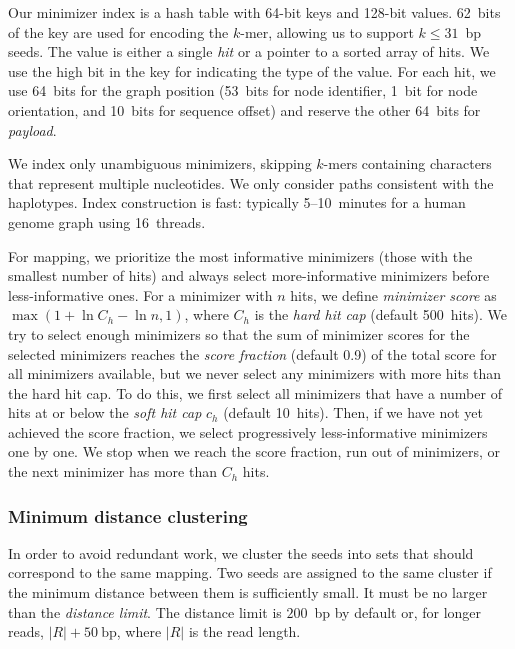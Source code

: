 \documentclass[11pt]{ucscthesis}
\newcommand{\param}[1]{\emph{#1}}
\newcommand{\vocab}[1]{\emph{#1}}
\begin{document}
Our minimizer index is a hash table with 64-bit keys and 128-bit values.
62~bits of the key are used for encoding the $k$-mer, allowing us to support $k \le 31$~bp seeds.
The value is either a single \vocab{hit} or a pointer to a sorted array of hits.
We use the high bit in the key for indicating the type of the value.
For each hit, we use 64~bits for the graph position (53~bits for node identifier, 1~bit for node orientation, and 10~bits for sequence offset) and reserve the other 64~bits for \vocab{payload}.

We index only unambiguous minimizers, skipping $k$-mers containing characters that represent multiple nucleotides.
We only consider paths consistent with the haplotypes.
Index construction is fast: typically 5--10~minutes for a human genome graph using 16~threads.

For mapping, we prioritize the most informative minimizers (those with the smallest number of hits) and always select more-informative minimizers before less-informative ones.
For a minimizer with $n$ hits, we define \vocab{minimizer score} as $\max\left(1 + \ln C_h - \ln n, 1\right)$, where $C_h$ is the \param{hard hit cap} (default 500~hits).
We try to select enough minimizers so that the sum of minimizer scores for the selected minimizers reaches the \param{score fraction} (default 0.9) of the total score for all minimizers available, but we never select any minimizers with more hits than the hard hit cap.
To do this, we first select all minimizers that have a number of hits at or below the \param{soft hit cap} $c_h$ (default 10~hits).
Then, if we have not yet achieved the score fraction, we select progressively less-informative minimizers one by one. We stop when we reach the score fraction, run out of minimizers, or the next minimizer has more than $C_h$ hits.

\subsubsection{Minimum distance clustering}
\label{subsec:aim2:clustering}
In order to avoid redundant work, we cluster the seeds into sets that should correspond to the same mapping.
Two seeds are assigned to the same cluster if the minimum distance between them is sufficiently small. It must be no larger than the \param{distance limit}. The distance limit is $200$~bp by default or, for longer reads, $|R| + 50~\mathrm{bp}$, where $|R|$ is the read length.
\end{document}
